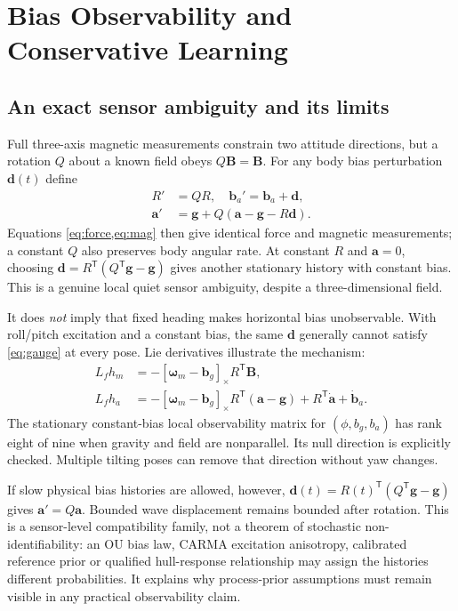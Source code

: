 \documentclass[conference]{IEEEtran}
\newcommand{\vc}[1]{\bm{#1}}
\newcommand{\sk}[1]{[#1]_\times}
\newcommand{\tr}{^{\mathsf T}}
\begin{document}
\section{Bias Observability and Conservative Learning}
\subsection{An exact sensor ambiguity and its limits}
Full three-axis magnetic measurements constrain two attitude directions,
but a rotation $Q$ about a known field obeys $Q\vc B=\vc B$. For any body
bias perturbation $\vc d(t)$ define
\begin{align}
 R'&=QR,\quad \vc b_a'=\vc b_a+\vc d,\\
 \vc a'&=\vc g+Q(\vc a-\vc g-R\vc d).\label{eq:gauge}
\end{align}
Equations \cref{eq:force,eq:mag} then give identical force and magnetic
measurements; a constant $Q$ also preserves body angular rate. At constant
$R$ and $\vc a=0$, choosing
$\vc d=R\tr(Q\tr\vc g-\vc g)$ gives another stationary history with
constant bias. This is a genuine local quiet sensor ambiguity, despite a
three-dimensional field.

It does \emph{not} imply that fixed heading makes horizontal bias
unobservable. With roll/pitch excitation and a constant bias, the same
$\vc d$ generally cannot satisfy \cref{eq:gauge} at every pose. Lie
derivatives illustrate the mechanism:
\begin{align}
 L_fh_m&=-\sk{\vc\omega_m-\vc b_g}R\tr\vc B,\\
 L_fh_a&=-\sk{\vc\omega_m-\vc b_g}R\tr(\vc a-\vc g)
          +R\tr\dot{\vc a}+\dot{\vc b}_a.
\end{align}
The stationary constant-bias local observability matrix for
$(\phi,b_g,b_a)$ has rank eight of nine when gravity and field are
nonparallel. Its null direction is explicitly checked. Multiple tilting
poses can remove that direction without yaw changes.

If slow physical bias histories are allowed, however,
$\vc d(t)=R(t)\tr(Q\tr\vc g-\vc g)$ gives $\vc a'=Q\vc a$.
Bounded wave displacement remains bounded after rotation. This is a
sensor-level compatibility family, not a theorem of stochastic
non-identifiability: an OU bias law, CARMA excitation anisotropy, calibrated
reference prior or qualified hull-response relationship may assign the
histories different probabilities. It explains why process-prior assumptions
must remain visible in any practical observability claim.
\end{document}
